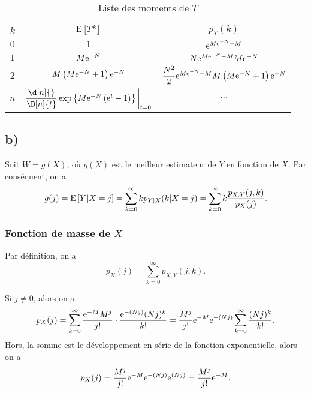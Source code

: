 \documentclass[11pt]{article}
\newcommand\Esp[1]{%
	\ensuremath{%
		\mathrm{E}\left[#1\right]%
	}%
}%
\newcommand\Espg[2]{%
	\ensuremath{%
		\mathrm{E}\left[#1\middle\rvert#2\right]%
	}%
}%
\newcommand\e{%
    \ensuremath{%
        \mathrm{e}%
    }%
}
\begin{document}
\begin{table}[H]
    \centering
    \caption{Liste des moments de $T$}
    \vspace{5mm}
    \begin{tabular}{ccc}
        \toprule
        $k$ & $\Esp{T^k}$ & $p_Y(k)$\\
        \midrule
        $0$ 
            & $1$
            & $\e^{M\e^{-N}-M}$\\
        $1$ 
            & $M\e^{-N}$
            & $N\e^{M\e^{-N}-M}M\e^{-N}$\\
        $2$ 
            & $M\left(M\e^{-N}+1\right)\e^{-N}$
            & $\dfrac{N^2}{2}\e^{M\e^{-N}-M}M
              \left(M\e^{-N}+1\right)\e^{-N}$\\
        $n$
            & $\dfrac{\d[n]{}}{\D[n]{t}}\exp\left\{
              {M\e^{-N}\left(\e^t-1\right)}\right\}
              \bigg\rvert_{t=0}$
            & $\cdots$\\
        \bottomrule
    \end{tabular}
    \label{tb:moment}
\end{table}

\subsection{b)}
Soit $W=g(X)$, où $g(X)$ est le meilleur estimateur de $Y$ en fonction de $X$.
Par conséquent, on a
\begin{equation}\label{eq:estimateur}
    g(j)
    =\Espg{Y}{X=j}
    =\sum_{k=0}^\infty kp_{Y|X}(k|X=j)
    =\sum_{k=0}^\infty k\frac{p_{X,Y}(j,k)}{p_X(j)}.
\end{equation}

\subsubsection*{Fonction de masse de \boldmath $X$}
Par définition, on a
\begin{equation*}
    p_X(j)
    =\sum_{k=0}^\infty p_{X,Y}(j,k).
\end{equation*}

Si $j\neq 0$, alors on a
\begin{equation*}
    p_X(j)
    =\sum_{k=0}^\infty\frac{\e^{-M}M^j}{j!}
        \cdot\frac{\e^{-(Nj)}(Nj)^k}{k!}
    =\frac{M^j}{j!}\e^{-M}\e^{-(Nj)}\sum_{k=0}^\infty\frac{(Nj)^k}{k!}.
\end{equation*}
Hors, la somme est le développement en série de la fonction exponentielle,
alors on a
\begin{equation*}
    p_X(j)
    =\frac{M^j}{j!}\e^{-M}\e^{-(Nj)}\e^{(Nj)}
    =\frac{M^j}{j!}\e^{-M}.
\end{equation*}
\end{document}
